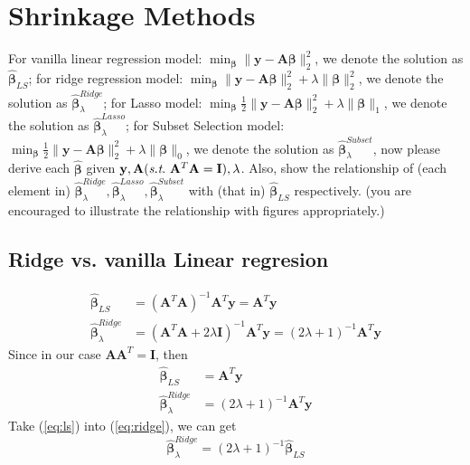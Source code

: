 \documentclass[11pt]{article}
\newcommand{\mtx}[1]{\mathbf{#1}}
\newcommand{\vct}[1]{\mathbf{#1}}
\def \mA {\mtx{A}}
\def \mI {\mtx{I}}
\def \vy {\vct{y}}
\begin{document}
\section{Shrinkage Methods}
For vanilla linear regression model: $\min_{\bm{\beta}} \|\vy-\mA\bm{\beta}\|_2^2$, 
we denote the solution as $\hat{\bm{\beta}}_{LS}$; for ridge regression model: 
$\min_{\bm{\beta}} \|\vy-\mA\bm{\beta}\|_2^2+\lambda\|\bm{\beta}\|_2^2$, 
we denote the solution as $\hat{\bm{\beta}}_\lambda^{Ridge}$; for Lasso model: 
$\min_{\bm{\beta}} \frac{1}{2}\|\vy-\mA\bm{\beta}\|_2^2+\lambda\|\bm{\beta}\|_1$, 
we denote the solution as $\hat{\bm{\beta}}_\lambda^{Lasso}$; 
for Subset Selection model:  $\min_{\bm{\beta}} \frac{1}{2}\|\vy-\mA\bm{\beta}\|_2^2+\lambda\|\bm{\beta}\|_0$, 
we denote the solution as $\hat{\bm{\beta}}_\lambda^{Subset}$, 
now please derive each $\hat{\bm{\beta}}$ given $\vy, \mA  (\st \ \mA^T\mA=\mI), \lambda$. 
Also, show the relationship of (each element in) $\hat{\bm{\beta}}_\lambda^{Ridge}, 
\hat{\bm{\beta}}_\lambda^{Lasso}, \hat{\bm{\beta}}_\lambda^{Subset}$ 
with (that in) $\hat{\bm{\beta}}_{LS}$ respectively. (you are encouraged to illustrate the relationship with figures appropriately.)


\subsection{Ridge vs. vanilla Linear regresion}
\begin{align*}
	\hat{\bm{\beta}}_{LS} &= (\mA^T\mA)^{-1}\mA^T\vy = \mA^T\vy\\
	\hat{\bm{\beta}}_\lambda^{Ridge} &= (\mA^T\mA+2\lambda\mI)^{-1}\mA^T\vy = (2\lambda+1)^{-1}\mA^T\vy
\end{align*}
Since in our case $\mA\mA^T=\mI$, then
\begin{align}
	\hat{\bm{\beta}}_{LS} &= \mA^T\vy \label{eq:ls}\\
	\hat{\bm{\beta}}_\lambda^{Ridge} &= (2\lambda+1)^{-1}\mA^T\vy \label{eq:ridge}
\end{align}
Take (\ref{eq:ls}) into (\ref{eq:ridge}), we can get 
\begin{equation}
	\hat{\bm{\beta}}_\lambda^{Ridge} = (2\lambda+1)^{-1}\hat{\bm{\beta}}_{LS}
\end{equation}
\end{document}
